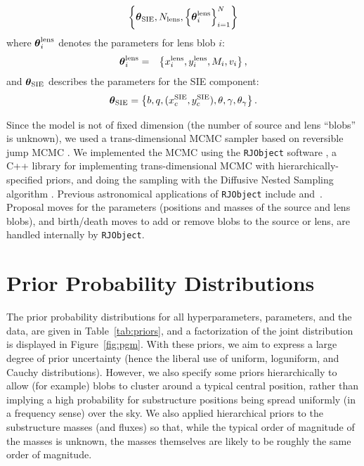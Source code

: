 \documentclass[useAMS,usenatbib]{mn2e}
\begin{document}
\begin{eqnarray}
\left\{
\boldsymbol{\theta}_{\rm SIE},
N_{\rm lens}, \left\{\boldsymbol{\theta}^{\rm lens}_i\right\}_{i=1}^N
\right\}
\end{eqnarray}
where $\boldsymbol{\theta}^{\rm lens}_i$ denotes the parameters for lens blob $i$:
\begin{eqnarray}
\boldsymbol{\theta}^{\rm lens}_i &=& \left\{x_i^{\rm lens}, y_i^{\rm lens}, M_i, v_i
\right\},
\end{eqnarray}
and $\boldsymbol{\theta}_{\rm SIE}$ describes the parameters for the SIE
component:
\begin{eqnarray}
\boldsymbol{\theta}_{\rm SIE} = \left\{
b, q, (x_c^{\rm SIE}, y_c^{\rm SIE}), \theta, \gamma, \theta_\gamma
\right\}.
\end{eqnarray}

Since the model is not of fixed dimension (the number of source and lens
``blobs'' is unknown), we used a trans-dimensional MCMC sampler based on
reversible jump MCMC \citep{green}. We implemented the MCMC using the
{\tt RJObject} software \citep{rjobject}, a C++ library for implementing trans-dimensional
MCMC with hierarchically-specified priors, and doing the sampling with the
Diffusive Nested Sampling algorithm \citep{dnest}. Previous astronomical
applications of {\tt RJObject} include \citet{magnetron}
and~\citet{exoplanet}. Proposal moves for the parameters (positions and masses
of the source and lens blobs), and birth/death moves to add or remove blobs
to the source or lens, are handled internally by {\tt RJObject}.


\section{Prior Probability Distributions}
The prior probability distributions for all hyperparameters, parameters, and
the data, are given in Table~\ref{tab:priors}, and a factorization of the
joint distribution is displayed in Figure~\ref{fig:pgm}. With these priors,
we aim to express a large degree of prior uncertainty (hence the liberal use
of uniform, loguniform, and Cauchy distributions). However, we also specify
some priors hierarchically to allow (for example)
blobs to cluster around a typical central
position, rather than implying a high probability for substructure positions
being spread uniformly (in a frequency sense) over the sky. We also applied
hierarchical priors to the substructure masses (and fluxes) so that, while
the typical order of magnitude of the masses is unknown, the masses
themselves are likely to be roughly the same order of magnitude.
\end{document}
